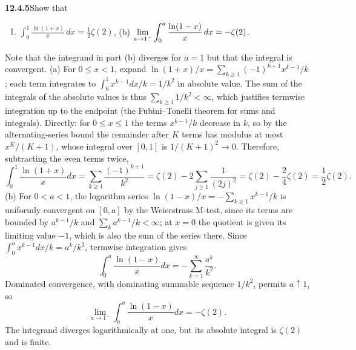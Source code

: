 \par\bigskip
\noindent\textbf{12.4.5}\quad Show that
\begin{enumerate}
\item[(a)] $\displaystyle\int_{0}^{1}\frac{\ln(1+x)}{x}\,dx=\frac{1}{2}\zeta(2)$,\quad
(b) $\displaystyle\lim_{a\to1^{-}}\int_{0}^{a}\frac{\ln(1-x)}{x}\,dx=\erratum{-}\zeta(2)$.
\end{enumerate}
Note that the integrand in part (b) diverges for $a=1$ but that the integral
is convergent.
\solution
(a) For $0\le x<1$, expand
$\ln(1+x)/x=\sum_{k\ge1}(-1)^{k+1}x^{k-1}/k$; each term integrates to
$\int_0^1x^{k-1}dx/k=1/k^2$ in absolute value.
The sum of the integrals of the absolute values is thus
$\sum_{k\ge1}1/k^2<\infty$, which justifies termwise integration up
to the endpoint (the Fubini--Tonelli theorem for sums and integrals).
Directly: for $0\le x\le1$ the terms $x^{k-1}/k$ decrease in $k$, so by
the alternating-series bound the remainder after $K$ terms has modulus at
most $x^K/(K+1)$, whose integral over $[0,1]$ is $1/(K+1)^2\to0$.
Therefore, subtracting the even terms twice,
\[
\int_0^1\frac{\ln(1+x)}x dx
=\sum_{k\ge1}\frac{(-1)^{k+1}}{k^2}
=\zeta(2)-2\sum_{j\ge1}\frac1{(2j)^2}
=\zeta(2)-\frac24\zeta(2)
=\boxed{\frac12\zeta(2)}.
\]
(b) For $0<a<1$, the logarithm series
$\ln(1-x)/x=-\sum_{k\ge1}x^{k-1}/k$ is uniformly convergent on
$[0,a]$ by the Weierstrass M-test, since its terms are bounded by
$a^{k-1}/k$ and $\sum_ka^{k-1}/k<\infty$; at $x=0$ the quotient is given
its limiting value $-1$, which is also the sum of the series there.
Since $\int_0^ax^{k-1}dx/k=a^k/k^2$, termwise
integration gives
\[
\int_0^a\frac{\ln(1-x)}x dx
=-\sum_{k=1}^\infty\frac{a^k}{k^2}.
\]
Dominated convergence, with dominating summable sequence $1/k^2$,
permits $a\uparrow1$, so
\[
\boxed{\lim_{a\to1^-}\int_0^a\frac{\ln(1-x)}x dx=-\zeta(2)}.
\]
The integrand diverges logarithmically at one, but its absolute integral
is $\zeta(2)$ and is finite.

